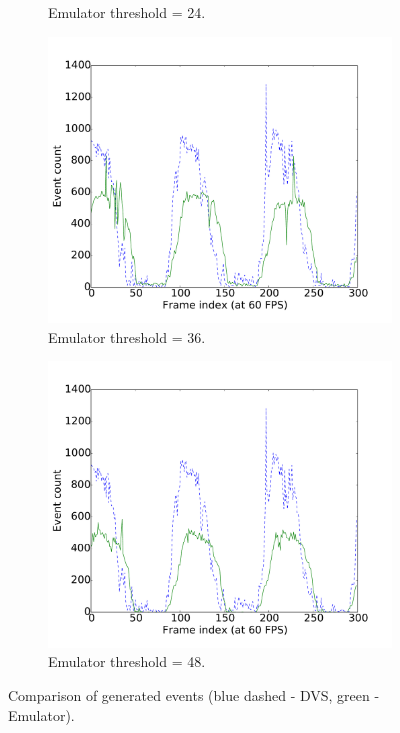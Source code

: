 \documentclass[conference]{IEEEtran}
\begin{document}
\begin{figure}[htb]
\begin{subfigure}[b]{0.24\textwidth}
    \caption{Emulator threshold = 24.}
    \label{fig:comp_24}
  \end{subfigure}
  \begin{subfigure}[b]{0.24\textwidth}
    \includegraphics[width=\textwidth]{event_compare_36}
    \caption{Emulator threshold = 36.}
    \label{fig:comp_30}
  \end{subfigure}
  \begin{subfigure}[b]{0.24\textwidth}
    \includegraphics[width=\textwidth]{event_compare_48}
    \caption{Emulator threshold = 48.}
    \label{fig:comp_48}
  \end{subfigure}
  
  \caption{Comparison of generated events (blue dashed - DVS, green - Emulator).}
  \label{fig:event_compare}
  
\end{figure}
\end{document}
